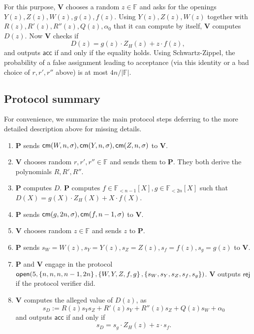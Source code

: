 \documentclass[11pt]{article}
\numberwithin{figure}{section} %
\newcommand{\set}[1]{\ensuremath{\left\{#1\right\}}\xspace}
\newcommand{\F}{\ensuremath{\mathbb F}\xspace}
\newcommand{\rej}{\ensuremath{\mathsf{rej}}\xspace}
\newcommand{\acc}{\ensuremath{\mathsf{acc}}\xspace}
\newcommand{\defeq}{:=}
\newcommand{\prv}{\ensuremath{\mathsf{\mathbf{P}}}\xspace}
\newcommand{\ver}{\ensuremath{\mathsf{\mathbf{V}}}\xspace}
\newcommand{\polysofdeg}[1]{\ensuremath{\F_{< #1}[X]}\xspace}
\begin{document}
For this purpose, \ver chooses a random $z\in \F$ and asks for the openings $Y (z), Z(z), W(z), g(z), f(z)$. Using  $Y(z),Z(z),W(z)$ together with $R(z), R'(z), R''(z), Q(z), \alpha_0$ that it can compute by itself, \ver computes $D(z)$. Now \ver checks if
\[D(z) = g(z) \cdot Z_H(z) + z \cdot f(z),\]
and outputs \acc if and only if the equality holds.
Using Schwartz-Zippel, the probability of a false assignment leading to acceptance (via this identity or a bad choice of $r, r', r''$ above) is at most $4n/|\F|$.

\subsection{Protocol summary}
For convenience, we summarize the main protocol steps deferring to the more detailed description above for missing details.

\begin{enumerate}
 \item \prv sends $\mathsf{cm}(W,n,\sigma),\mathsf{cm}(Y,n,\sigma),\mathsf{cm}(Z,n,\sigma)$ to \ver.
 \item\label{step:ver1} \ver chooses random $r,r',r''\in \F$ and sends them to \prv. They both derive the polynomials $R,R',R''$.
 \item \prv computes $D$. \prv computes $f\in \polysofdeg{n-1},g\in \polysofdeg{2n}$ such that $D(X)=g(X)\cdot Z_H(X) + X\cdot f(X)$.
 \item \prv sends $\mathsf{cm}(g,2n,\sigma), \mathsf{cm}(f,n-1,\sigma)$ to \ver.
 \item\label{step:ver2} \ver chooses random $z\in \F$ and sends $z$ to \prv.
 \item \prv sends $s_W = W(z),s_Y= Y(z),s_Z = Z(z),s_f = f(z),s_g = g(z)$ to \ver.
 \item\label{step:veropen}  \prv and \ver engage in the protocol $\open(5,\set{n,n,n,n-1,2n},\set{W,Y,Z,f,g},\set{s_W,s_Y,s_Z,s_f,s_g})$. \ver outputs \rej if the protocol verifier did.
 \item\label{step:ver3} \ver computes the alleged value of $D(z)$, as 
 \[s_D\defeq R(z)s_Y s_Z + R'(z)s_Y+ R''(z)s_Z+ Q(z)s_W + \alpha_0  \]
and outputs \acc if and only if \[s_D = s_g \cdot Z_H(z) + z \cdot s_f.\]
 
\end{enumerate}

% 
\end{document}
